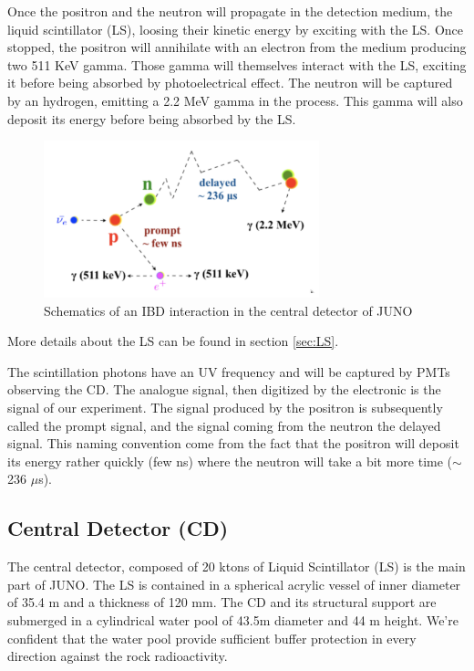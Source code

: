 Once the positron and the neutron will propagate in the detection medium, the liquid scintillator (LS), loosing their kinetic energy by exciting with the LS. Once stopped, the positron will annihilate with an electron from the medium producing two 511 KeV gamma. Those gamma will themselves interact with the LS, exciting it before being absorbed by photoelectrical effect. The neutron will be captured by an hydrogen, emitting a 2.2 MeV gamma in the process. This gamma will also deposit its energy before being absorbed by the LS.

\begin{figure}[ht]
  \centering
  \includegraphics[width=8cm]{images/juno/IDB-JUNO.png}
  \caption{Schematics of an IBD interaction in the central detector of JUNO}
  \label{fig:IBD}
\end{figure}

More details about the LS can be found in section \ref{sec:LS}.

The scintillation photons have an UV frequency and will be captured by PMTs observing the CD. The analogue signal, then digitized by the electronic is the signal of our experiment. The signal produced by the positron is subsequently called the prompt signal, and the signal coming from the neutron the delayed signal. This naming convention come from the fact that the positron will deposit its energy rather quickly (few ns) where the neutron will take a bit more time ($\sim$ 236 $\mu$s).

\subsection{Central Detector (CD)}
\label{sec:CD}

The central detector, composed of 20 ktons of Liquid Scintillator (LS) is the main part of JUNO. The LS is contained in a spherical acrylic vessel of inner diameter of 35.4 m and a thickness of 120 mm. The CD and its structural support are submerged in a cylindrical water pool of 43.5m diameter and 44 m height. We're confident that the water pool provide sufficient buffer protection in every direction against the rock radioactivity.
